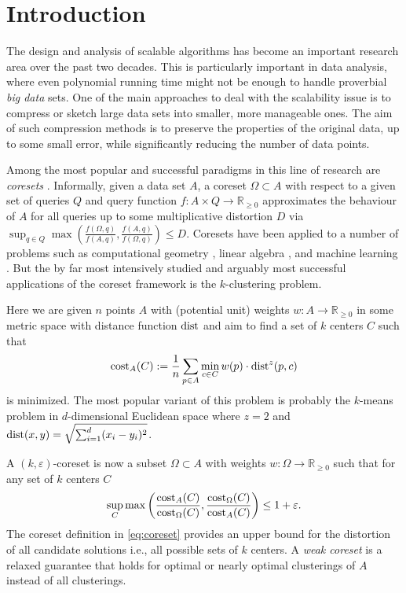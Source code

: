 \section{Introduction}

The design and analysis of scalable algorithms has become an important research area over the past two decades. This is particularly important in data analysis, where even polynomial running time might not be enough to handle proverbial \emph{big data} sets.
One of the main approaches to deal with the scalability issue is to compress or sketch large data sets into smaller, more manageable ones. The aim of such compression methods is to preserve the properties of the original data, up to some small error, while significantly reducing the number of data points.

Among the most popular and successful paradigms in this line of research are \emph{coresets} \cite{MunteanuS18}. Informally, given a data set $A$, a coreset $\Omega \subset A$ with respect to a given set of queries $Q$ and query function $f: A\times Q \rightarrow \mathbb{R}_{\geq 0}$ approximates the behaviour of $A$ for all queries up to some multiplicative distortion $D$ via $\sup_{q\in Q} \max\left( \frac{f(\Omega,q)}{f(A,q)},\frac{f(A,q)}{f(\Omega,q)}\right) \leq D.$
Coresets have been applied to a number of problems such as computational geometry \cite{AHV05,Chan09}, linear algebra \cite{IndykMGR20,maalouf2019fast}, and machine learning \cite{MMR21,MunteanuSSW18}. But the by far most intensively studied and arguably most successful applications of the coreset framework is the $k$-clustering problem.

Here we are given $n$ points $A$ with (potential unit) weights $w:A\rightarrow \mathbb{R}_{\geq 0}$ in some metric space with distance function $\text{dist}$ and aim to find a set of $k$ centers $C$ such that 
\begin{equation*}
\text{cost}_A(C):= \frac{1}{n} \sum_{p\in A}  \min_{c\in C} w(p)\cdot \text{dist}^z(p,c)
\end{equation*}
is minimized. The most popular variant of this problem is probably the $k$-means problem in $d$-dimensional Euclidean space where $z=2$ and $\text{dist}(x,y) = \sqrt{\sum_{i=1}^d (x_i-y_i)^2}$.

A $(k,\varepsilon)$-coreset is now a subset $\Omega\subset A$ with weights $w:\Omega\rightarrow \mathbb{R}_{\geq 0}$ such that for any set of $k$ centers $C$
\begin{equation}
\label{eq:coreset}
\sup_{C} \max\left( \frac{\text{cost}_A(C)}{\text{cost}_{\Omega}(C)},\frac{\text{cost}_{\Omega}(C)}{\text{cost}_{A}(C)}\right) \leq 1+\varepsilon.
\end{equation}
The coreset definition in \cref{eq:coreset} provides an upper bound for the distortion of all candidate solutions i.e., all possible sets of $k$ centers. 
A \emph{weak coreset} is a relaxed guarantee that holds for optimal or nearly optimal clusterings of $A$ instead of all clusterings.


